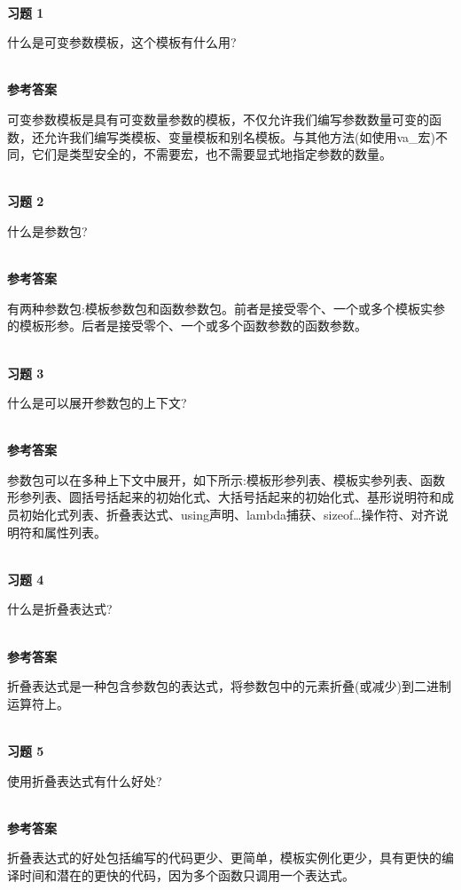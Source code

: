 \hspace*{\fill} \\ %
\noindent
\textbf{习题 1}

什么是可变参数模板，这个模板有什么用?

\hspace*{\fill} \\ %
\noindent
\textbf{参考答案}

可变参数模板是具有可变数量参数的模板，不仅允许我们编写参数数量可变的函数，还允许我们编写类模板、变量模板和别名模板。与其他方法(如使用va\_宏)不同，它们是类型安全的，不需要宏，也不需要显式地指定参数的数量。


\hspace*{\fill} \\ %
\noindent
\textbf{习题 2}

什么是参数包?

\hspace*{\fill} \\ %
\noindent
\textbf{参考答案}

有两种参数包:模板参数包和函数参数包。前者是接受零个、一个或多个模板实参的模板形参。后者是接受零个、一个或多个函数参数的函数参数。

\hspace*{\fill} \\ %
\noindent
\textbf{习题 3}

什么是可以展开参数包的上下文?

\hspace*{\fill} \\ %
\noindent
\textbf{参考答案}

参数包可以在多种上下文中展开，如下所示:模板形参列表、模板实参列表、函数形参列表、圆括号括起来的初始化式、大括号括起来的初始化式、基形说明符和成员初始化式列表、折叠表达式、using声明、lambda捕获、sizeof…操作符、对齐说明符和属性列表。

\hspace*{\fill} \\ %
\noindent
\textbf{习题 4}

什么是折叠表达式?

\hspace*{\fill} \\ %
\noindent
\textbf{参考答案}

折叠表达式是一种包含参数包的表达式，将参数包中的元素折叠(或减少)到二进制运算符上。

\hspace*{\fill} \\ %
\noindent
\textbf{习题 5}

使用折叠表达式有什么好处?

\hspace*{\fill} \\ %
\noindent
\textbf{参考答案}

折叠表达式的好处包括编写的代码更少、更简单，模板实例化更少，具有更快的编译时间和潜在的更快的代码，因为多个函数只调用一个表达式。













